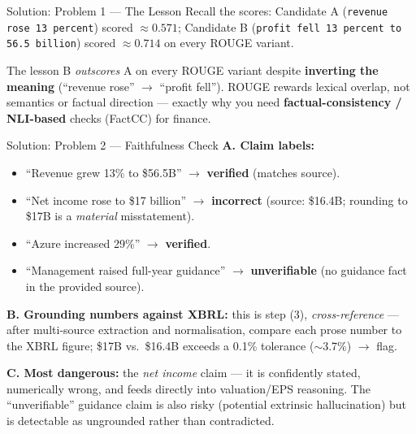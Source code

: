 \documentclass[9pt,t]{beamer}
\begin{document}
\begin{frame}{Solution: Problem 1 --- The Lesson}
Recall the scores: Candidate A (\texttt{revenue rose 13 percent}) scored
$\approx 0.571$; Candidate B (\texttt{profit fell 13 percent to 56.5 billion})
scored $\approx 0.714$ on every ROUGE variant.

\medskip
\begin{alertblock}{The lesson}
B \emph{outscores} A on every ROUGE variant despite \textbf{inverting the meaning}
(``revenue rose'' $\to$ ``profit fell''). ROUGE rewards lexical overlap, not
semantics or factual direction --- exactly why you need \textbf{factual-consistency
/ NLI-based} checks (FactCC) for finance.
\end{alertblock}
\end{frame}

\begin{frame}{Solution: Problem 2 --- Faithfulness Check}
\textbf{A. Claim labels:}
\begin{itemize}
  \item ``Revenue grew 13\% to \$56.5B'' $\to$ \textbf{verified} (matches source).
  \item ``Net income rose to \$17 billion'' $\to$ \textbf{incorrect}
        (source: \$16.4B; rounding to \$17B is a \emph{material} misstatement).
  \item ``Azure increased 29\%'' $\to$ \textbf{verified}.
  \item ``Management raised full-year guidance'' $\to$ \textbf{unverifiable}
        (no guidance fact in the provided source).
\end{itemize}

\medskip
\textbf{B. Grounding numbers against XBRL:} this is step (3),
\emph{cross-reference} --- after multi-source extraction and normalisation,
compare each prose number to the XBRL figure; \$17B vs.\ \$16.4B exceeds a 0.1\%
tolerance ($\sim$3.7\%) $\to$ flag.

\medskip
\textbf{C. Most dangerous:} the \emph{net income} claim --- it is confidently
stated, numerically wrong, and feeds directly into valuation/EPS reasoning. The
``unverifiable'' guidance claim is also risky (potential extrinsic hallucination)
but is detectable as ungrounded rather than contradicted.
\end{frame}
\end{document}
